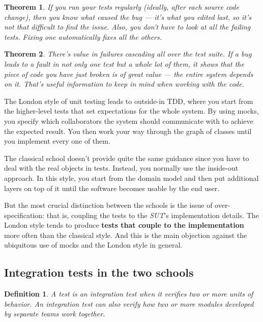\documentclass{article}
\newtheorem{definition}{Definition}
\newtheorem{theorem}{Theorem}
\begin{document}
\begin{theorem}
If you run your tests regularly (ideally, after each source code change), then you know what caused the bug — it’s what you edited last, so it’s not that difficult to find the issue. Also, you don’t have to look at all the failing tests. Fixing one automatically fixes all the others.
\end{theorem}

\begin{theorem}
There’s value in failures cascading all over the test suite. If a bug leads to a fault in not only one test but a whole lot of them, it shows that the piece of code you have just broken is of great value — the entire system depends on it. That’s useful information to keep in mind when working with the code.
\end{theorem}

The London style of unit testing leads to outside-in TDD, where you start from the higher-level tests that set expectations for the whole system. By using mocks, you specify which collaborators the system should communicate with to achieve the expected result. You then work your way through the graph of classes until you implement every one of them. 

The classical school doesn’t provide quite the same guidance since you have to deal with the real objects in tests. Instead, you normally use the inside-out approach. In this style, you start from the domain model and then put additional layers on top of it until the software becomes usable by the end user.

But the most crucial distinction between the schools is the issue of over-specification: that is, coupling the tests to the \textit{SUT}’s implementation details. The London style tends to produce \textbf{tests that couple to the implementation} more often than the classical style. And this is the main objection against the ubiquitous use of mocks and the London style in general.

\subsection{Integration tests in the two schools}

\begin{definition}
A test is an integration test when it verifies two or more units of behavior. An integration test can also verify how two or more modules developed by separate teams work together. 
\end{definition}
\end{document}
